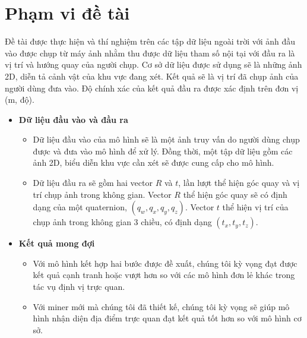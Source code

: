 \section{Phạm vi đề tài}
Đề tài được thực hiện và thí nghiệm trên các tập dữ liệu ngoài trời với ảnh đầu vào được chụp từ máy ảnh nhằm thu được dữ liệu tham số nội tại với đầu ra là vị trí và hướng quay của người chụp. Cơ sở dữ liệu được sử dụng sẽ là những ảnh 2D, diễn tả cảnh vật của khu vực đang xét. Kết quả sẽ là vị trí đã chụp ảnh của người dùng đưa vào. Độ chính xác của kết quả đầu ra được xác định trên đơn vị (m, độ).
\begin{itemize}
    \item \textbf{Dữ liệu đầu vào và đầu ra}
          \begin{itemize}
              \item Dữ liệu đầu vào của mô hình sẽ là một ảnh truy vấn do người dùng chụp được và đưa vào mô hình để xử lý. Đồng thời, một tập dữ liệu gồm các ảnh 2D, biểu diễn khu vực cần xét sẽ được cung cấp cho mô hình.
              \item Dữ liệu đầu ra sẽ gồm hai vector $R$ và $t$, lần lượt thể hiện góc quay và vị trí chụp ảnh trong không gian. Vector $R$ thể hiện góc quay sẽ có định dạng của một quaternion, $(q_w,q_x,q_y,q_z)$. Vector $t$ thể hiện vị trí của chụp ảnh trong không gian 3 chiều, có định dạng $(t_x,t_y,t_z)$.
          \end{itemize}
    \item \textbf{Kết quả mong đợi}
          \begin{itemize}
			 	\item Với mô hình kết hợp hai bước được đề xuất, chúng tôi kỳ vọng đạt được kết quả cạnh tranh hoặc vượt hơn so với các mô hình đơn lẻ khác trong tác vụ định vị trực quan.
				\item Với miner mới mà chúng tôi đã thiết kế, chúng tôi kỳ vọng sẽ giúp mô hình nhận diện địa điểm trực quan đạt kết quả tốt hơn so với mô hình cơ sở.
          \end{itemize}
\end{itemize}

